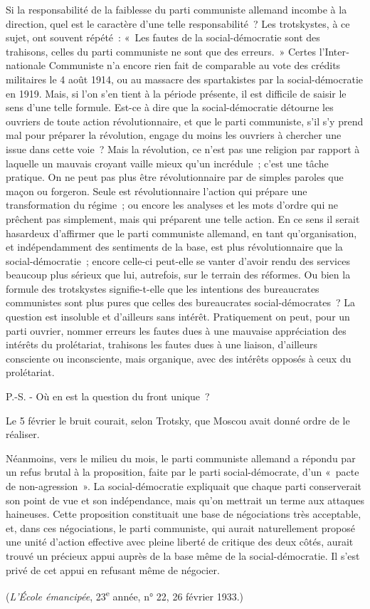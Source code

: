 \documentclass[french,twoside]{book} %
\begin{document}
Si la responsabilité de la faiblesse du parti communiste allemand incombe à la direction, quel est le caractère d'une telle responsabilité ? Les trotskystes, à ce sujet, ont souvent répété : « Les fautes de la social-démocratie sont des trahisons, celles du parti communiste ne sont que des erreurs. » Certes l'Inter­nationale Communiste n'a encore rien fait de comparable au vote des crédits militaires le 4 août 1914, ou au massacre des spartakistes par la social-démocratie en 1919. Mais, si l'on s'en tient à la période présente, il est difficile de saisir le sens d'une telle formule. Est-ce à dire que la social-démocratie détourne les ouvriers de toute action révolutionnaire, et que le parti commu­niste, s'il s'y prend mal pour préparer la révolution, engage du moins les ouvriers à chercher une issue dans cette voie ? Mais la révolution, ce n'est pas une religion par rapport à laquelle un mauvais croyant vaille mieux qu'un incrédule ; c'est une tâche pratique. On ne peut pas plus être révolutionnaire par de simples paroles que maçon ou forgeron. Seule est révolutionnaire l'action qui prépare une transformation du régime ; ou encore les analyses et les mots d'ordre qui ne prêchent pas simplement, mais qui préparent une telle action. En ce sens il serait hasardeux d'affirmer que le parti communiste allemand, en tant qu'organisation, et indépendamment des sentiments de la base, est plus révolutionnaire que la social-démocratie ; encore celle-ci peut-elle se vanter d'avoir rendu des services beaucoup plus sérieux que lui, autre­fois, sur le terrain des réformes. Ou bien la formule des trotskystes signifie-t-elle que les intentions des bureaucrates communistes sont plus pures que celles des bureaucrates social-démocrates ? La question est insoluble et d'ailleurs sans intérêt. Pratiquement on peut, pour un parti ouvrier, nommer erreurs les fautes dues à une mauvaise appréciation des intérêts du prolétariat, trahisons les fautes dues à une liaison, d'ailleurs consciente ou inconsciente, mais organique, avec des intérêts opposés à ceux du prolétariat.\par
P.-S. - Où en est la question du front unique ?\par
Le 5 février le bruit courait, selon Trotsky, que Moscou avait donné ordre de le réaliser.\par
Néanmoins, vers le milieu du mois, le parti communiste allemand a répon­du par un refus brutal à la proposition, faite par le parti social-démocrate, d'un « pacte de non-agression ». La social-démocratie expliquait que chaque parti conserverait son point de vue et son indépendance, mais qu'on mettrait un terme aux attaques haineuses. Cette proposition constituait une base de négo­ciations très acceptable, et, dans ces négociations, le parti communiste, qui aurait naturellement proposé une unité d'action effective avec pleine liberté de critique des deux côtés, aurait trouvé un précieux appui auprès de la base même de la social-démocratie. Il s'est privé de cet appui en refusant même de négocier.\par
({\itshape L'École émancipée}, 23\textsuperscript{e} année, n° 22, 26 février 1933.)
\end{document}
